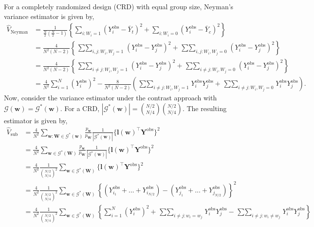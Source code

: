 \documentclass[12pt]{article}
\begin{document}
For a completely randomized design (CRD) with equal group size, Neyman's variance estimator is given by,
\begin{align}
    \hat{V}_{\text{Neyman}} & = \frac{1}{\frac{N}{2}(\frac{N}{2}-1)}\left\{\sum_{i:W_i = 1}(Y^{\text{obs}}_i - \bar{Y}_t)^2+ \sum_{i:W_i = 0}(Y^{\text{obs}}_i - \bar{Y}_c)^2 \right\} \nonumber\\
    & = \frac{4}{N^2(N-2)}\left\{\mathop{\sum\sum}_{i,j:W_i,W_j = 1}(Y^{\text{obs}}_i - Y^{\text{obs}}_j)^2 + \mathop{\sum\sum}_{i,j:W_i,W_j = 0}(Y^{\text{obs}}_i - Y^{\text{obs}}_j)^2 \right\} \nonumber \\
    & = \frac{4}{N^2(N-2)}\left\{\mathop{\sum\sum}_{i\neq j:W_i,W_j = 1}(Y^{\text{obs}}_i - Y^{\text{obs}}_j)^2 + \mathop{\sum\sum}_{i\neq j:W_i,W_j = 0}(Y^{\text{obs}}_i - Y^{\text{obs}}_j)^2 \right\} \nonumber\\
    & = \frac{4}{N^2}\sum_{i=1}^{N}(Y^{\text{obs}}_i)^2 - \frac{8}{N^2(N-2)}\left(\mathop{\sum\sum}_{i \neq j: W_i,W_j = 1}Y^{\text{obs}}_i Y^{\text{obs}}_j + \mathop{\sum\sum}_{i \neq j: W_i,W_j = 0}Y^{\text{obs}}_i Y^{\text{obs}}_j \right). \label{eq_A_crd}
\end{align}
Now, consider the variance estimator under the contrast approach with $\mathcal{G}(\bm{w}) = \mathcal{G}^*(\bm{w})$. For a CRD, $|\mathcal{G}^*(\bm{w})| = \binom{N/2}{N/4}\binom{N/2}{N/4}$. The resulting estimator is given by,
\begin{align}
    \hat{V}_{\text{sub}} & = \frac{4}{N^2}\sum_{\bm{w}:\bm{W} \in \mathcal{G}^*(\bm{w})} \frac{p_{\bm{w}}}{p_{\bm{W}}} \frac{1}{|\mathcal{G}^*(\bm{w})|}\{\bm{l}(\bm{w})^\top \bm{Y}^{\text{obs}}\}^2 \nonumber \\
    &= \frac{4}{N^2} \sum_{\bm{w} \in \mathcal{G}^*(\bm{W})}\frac{p_{\bm{w}}}{p_{\bm{W}}} \frac{1}{|\mathcal{G}^*(\bm{w})|}\{\bm{l}(\bm{w})^\top \bm{Y}^{\text{obs}}\}^2 \nonumber \\
    & = \frac{4}{N^2} \frac{1}{\binom{N/2}{N/4}^2} \sum_{\bm{w} \in \mathcal{G}^*(\bm{W})} \{\bm{l}(\bm{w})^\top \bm{Y}^{\text{obs}}\}^2 \nonumber \\
    & = \frac{4}{N^2} \frac{1}{\binom{N/2}{N/4}^2} \sum_{\bm{w} \in \mathcal{G}^*(\bm{W})}\left\{(Y^{\text{obs}}_{i_1} +...+Y^{\text{obs}}_{i_{N/2}}) - (Y^{\text{obs}}_{j_1} +...+Y^{\text{obs}}_{j_{N/2}})\right\}^2 \nonumber \\
    & = \frac{4}{N^2} \frac{1}{\binom{N/2}{N/4}^2} \sum_{\bm{w} \in \mathcal{G}^*(\bm{W})} \left\{\sum_{i=1}^{N}(Y^{\text{obs}}_i)^2 + \mathop{\sum\sum}_{i\neq j: w_i=w_j}Y^{\text{obs}}_iY^{\text{obs}}_j - \mathop{\sum\sum}_{i\neq j: w_i\neq w_j}Y^{\text{obs}}_iY^{\text{obs}}_j \right\}
    \label{eq_A_vhat_crd}
\end{align}
\end{document}
